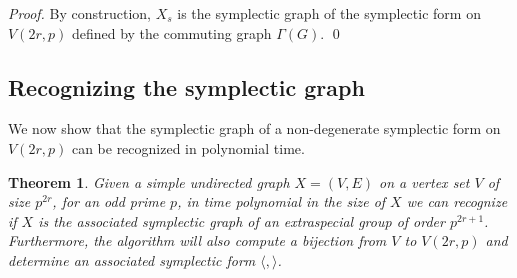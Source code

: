 \documentclass{elsarticle}
\newtheorem{theorem}{Theorem}[section]
\newcommand{\sympl}[1]{\langle #1 \rangle}
\begin{document}
\begin{proof}
By construction, $X_s$ is the symplectic graph of the symplectic
form on $V(2r,p)$ defined by the commuting graph $\Gamma(G)$. \qed
\end{proof}


\subsection{Recognizing the symplectic graph}

We now show that the symplectic graph of a non-degenerate symplectic
form on $V(2r,p)$ can be recognized in polynomial time.

\begin{theorem}\label{ortho-recog-thm}
  Given a simple undirected graph $X=(V,E)$ on a vertex set $V$ of
  size $p^{2r}$, for an odd prime $p$, in time polynomial in the size
  of $X$ we can recognize if $X$ is the associated symplectic graph of
  an extraspecial group of order $p^{2r+1}$. Furthermore, the
  algorithm will also compute a bijection from $V$ to $V(2r,p)$ and
  determine an associated symplectic form $\sympl{,}$.
\end{theorem}
\end{document}
